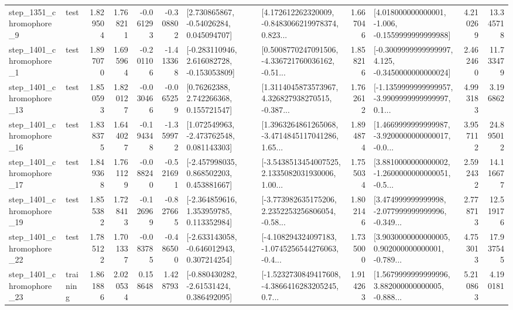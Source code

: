 \begin{tabular}{llrrrrllrlrr}
  step\_1351\_chromophore\_9 &      test &      1.829504 &    1.768211 &     -0.061293 & -0.308802 &     [2.730865867, -0.54026284, 0.045094707] &  [4.172612262320009, -0.8483066219978374, 0.823... &       1.667046 &   [4.018000000000001, -1.006, -0.1559999999999988] &            4.210269 &         13.345718 \\
  step\_1401\_chromophore\_1 &      test &      1.897070 &    1.695964 &     -0.201106 & -1.413368 &   [-0.283110946, 2.616082728, -0.153053809] &  [0.5008770247091506, -4.336721760036162, -0.51... &       1.858216 &  [-0.3009999999999997, 4.125, -0.3450000000000024] &            2.462460 &         11.733479 \\
 step\_1401\_chromophore\_13 &      test &      1.850593 &    1.820127 &     -0.030466 & -0.065259 &      [0.76262388, 2.742266368, 0.155721547] &  [1.3114045873573967, 4.326827938270515, -0.387... &       1.762612 &  [-1.1359999999999957, -3.9909999999999997, 0.1... &            4.993183 &          3.196862 \\
 step\_1401\_chromophore\_16 &      test &      1.838375 &    1.644027 &     -0.194348 & -1.359972 &    [1.072549963, -2.473762548, 0.081143303] &  [1.3963264861265068, -3.4714845117041286, 1.65... &       1.894874 &  [1.4669999999999987, -3.9200000000000017, -0.0... &            3.957112 &         24.895012 \\
 step\_1401\_chromophore\_17 &      test &      1.849368 &    1.761129 &     -0.088240 & -0.521691 &    [-2.457998035, 0.868502203, 0.453881667] &  [-3.5438513454007525, 2.1335082031930006, 1.00... &       1.755034 &  [3.8810000000000002, -1.2600000000000051, -0.5... &            2.592432 &         14.116677 \\
 step\_1401\_chromophore\_19 &      test &      1.855382 &    1.728413 &     -0.126969 & -0.827665 &    [-2.364859616, 1.353959785, 0.113352984] &  [-3.773982635175206, 2.2352253256806054, -0.58... &       1.802146 &  [3.474999999999998, -2.077999999999996, -0.349... &            2.778713 &         12.519176 \\
 step\_1401\_chromophore\_22 &      test &      1.785122 &    1.701337 &     -0.083785 & -0.486500 &   [-2.633143058, -0.646012943, 0.307214254] &  [-4.108294324097183, -1.0745256544276063, -0.4... &       1.735000 &  [3.9030000000000005, 0.902000000000001, -0.789... &            4.753013 &         17.937545 \\
 step\_1401\_chromophore\_23 &  training &      1.861886 &    2.020534 &      0.158648 &  1.428793 &    [-0.880430282, -2.61531424, 0.386492095] &  [-1.5232730849417608, -4.3866416283205245, 0.7... &       1.914263 &  [1.5679999999999996, 3.882000000000005, -0.888... &            5.210863 &          4.190181 \\

\end{tabular}
